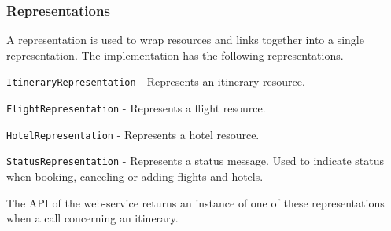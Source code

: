 \subsubsection{Representations}
A representation is used to wrap resources and links together into a single representation. 
The implementation has the following representations.
\begin{description}
	\item \texttt{ItineraryRepresentation} - Represents an itinerary resource. 
	\item \texttt{FlightRepresentation} - Represents a flight resource.
	\item \texttt{HotelRepresentation} - Represents a hotel resource.
	\item \texttt{StatusRepresentation} - Represents a status message. Used to indicate status when booking, canceling or adding flights and hotels.
\end{description}
The API of the web-service returns an instance of one of these representations when a call concerning an itinerary.
